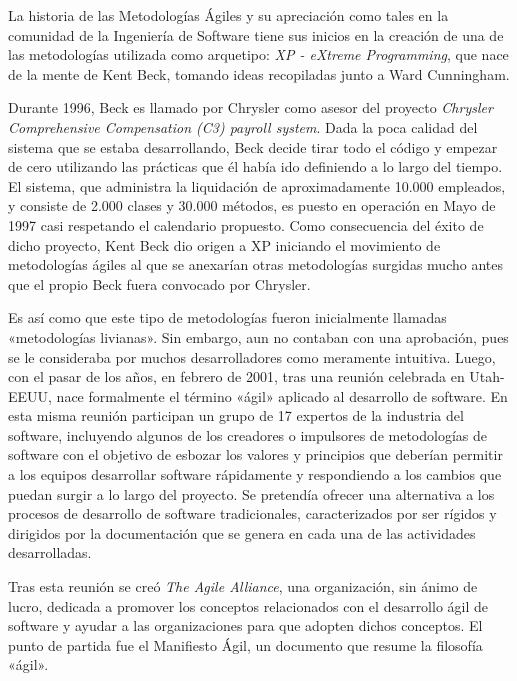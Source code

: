     La historia de las Metodologías Ágiles y su apreciación como tales en la comunidad de la Ingeniería de Software tiene sus inicios en la creación de una de las metodologías utilizada como arquetipo: {\it XP - eXtreme Programming}, que nace de la mente de Kent Beck, tomando ideas recopiladas junto a Ward Cunningham.

    Durante 1996, Beck es llamado por Chrysler como asesor del proyecto {\it Chrysler Comprehensive Compensation (C3) payroll system}. Dada la poca calidad del sistema que se estaba desarrollando, Beck decide tirar todo el código y empezar de cero utilizando las prácticas que él había ido definiendo a lo largo del tiempo. El sistema, que administra la liquidación de aproximadamente 10.000 empleados, y consiste de 2.000 clases y 30.000 métodos, es puesto en operación en Mayo de 1997 casi respetando el calendario propuesto. Como consecuencia del éxito de dicho proyecto, Kent Beck dio origen a XP iniciando el movimiento de metodologías ágiles al que se anexarían otras metodologías surgidas mucho antes que el propio Beck fuera convocado por Chrysler.
    	
    Es así como que este tipo de metodologías fueron inicialmente llamadas «metodologías livianas». Sin embargo, aun no contaban con una aprobación, pues se le consideraba por muchos desarrolladores como meramente intuitiva. Luego, con el pasar de los años, en febrero de 2001, tras una reunión celebrada en Utah-EEUU, nace formalmente el término «ágil» aplicado al desarrollo de software. En esta misma reunión participan un grupo de 17 expertos de la industria del software, incluyendo algunos de los creadores o impulsores de metodologías de software con el objetivo de esbozar los valores y principios que deberían permitir a los equipos desarrollar software rápidamente y respondiendo a los cambios que puedan surgir a lo largo del proyecto. Se pretendía ofrecer una alternativa a los procesos de desarrollo de software tradicionales, caracterizados por ser rígidos y dirigidos por la documentación que se genera en cada una de las actividades desarrolladas.

    Tras esta reunión se creó {\it The Agile Alliance}, una organización, sin ánimo de lucro, dedicada a promover los conceptos relacionados con el desarrollo ágil de software y ayudar a las organizaciones para que adopten dichos conceptos. El punto de partida fue el Manifiesto Ágil, un documento que resume la filosofía «ágil».
    
